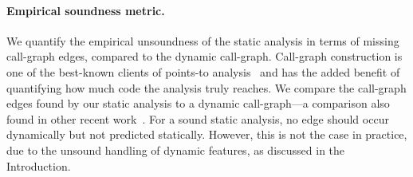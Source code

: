 


\paragraph{Empirical soundness metric.}
We quantify the empirical unsoundness of the static analysis in terms
of missing call-graph edges, compared to the dynamic
call-graph. Call-graph construction is one of the best-known clients
of points-to analysis~\cite{ecoop/AliL12,ecoop/AliL13,ecoop/LiTSX14}
and has the added benefit of quantifying how much code the analysis
truly reaches. We compare the call-graph edges found by our static
analysis to a dynamic call-graph---a comparison also found in other
recent work~\cite{pppj/StancuWBLF14}. For a sound static analysis, no
edge should occur dynamically but not predicted statically. However,
this is not the case in practice, due to the unsound handling of
dynamic features, as discussed in the Introduction.


